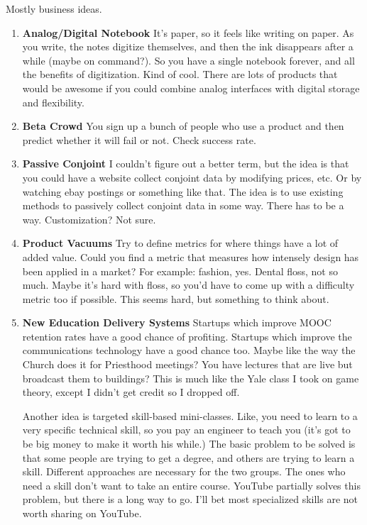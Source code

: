 \documentclass[paper=a4, fontsize=11pt]{scrartcl} %
\numberwithin{equation}{section} %
\numberwithin{figure}{section} %
\numberwithin{table}{section} %
\begin{document}
Mostly business ideas.

\begin{enumerate}

\item \textbf{Analog/Digital Notebook} It's paper, so it feels like writing on paper.  As you write, the notes digitize themselves, and then the ink disappears after a while (maybe on command?).  So you have a single notebook forever, and all the benefits of digitization.  Kind of cool.  There are lots of products that would be awesome if you could combine analog interfaces with digital storage and flexibility.  

\item \textbf{Beta Crowd} You sign up a bunch of people who use a product and then predict whether it will fail or not.  Check success rate.

\item \textbf{Passive Conjoint} I couldn't figure out a better term, but the idea is that you could have a website collect conjoint data by modifying prices, etc.  Or by watching ebay postings or something like that.  The idea is to use existing methods to passively collect conjoint data in some way.  There has to be a way.  Customization?  Not sure.

\item \textbf{Product Vacuums}  Try to define metrics for where things have a lot of added value.  Could you find a metric that measures how intensely design has been applied in a market?  For example: fashion, yes.  Dental floss, not so much.  Maybe it's hard with floss, so you'd have to come up with a difficulty metric too if possible.  This seems hard, but something to think about.

\item \textbf{New Education Delivery Systems}  Startups which improve MOOC retention rates have a good chance of profiting.  Startups which improve the communications technology have a good chance too.  Maybe like the way the Church does it for Priesthood meetings?  You have lectures that are live but broadcast them to buildings?  This is much like the Yale class I took on game theory, except I didn't get credit so I dropped off.  

Another idea is targeted skill-based mini-classes.  Like, you need to learn to a very specific technical skill, so you pay an engineer to teach you (it's got to be big money to make it worth his while.)  The basic problem to be solved is that some people are trying to get a degree, and others are trying to learn a skill.  Different approaches are necessary for the two groups.  The ones who need a skill don't want to take an entire course.  YouTube partially solves this problem, but there is a long way to go.  I'll bet most specialized skills are not worth sharing on YouTube.


\end{enumerate}
\end{document}
